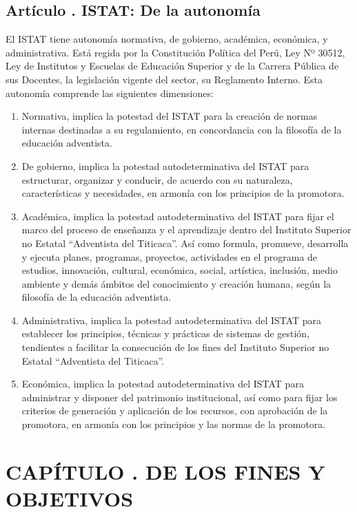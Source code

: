 \subsection{Artículo . ISTAT: De la autonomía}
\addtocounter{ns}{1}
El ISTAT tiene autonomía normativa, de gobierno, académica, económica, y administrativa. Está regida por la Constitución Política del Perú, Ley Nº 30512, Ley de Institutos y Escuelas de Educación Superior y de la Carrera Pública de sus Docentes, la legislación vigente del sector, su Reglamento Interno.  
Esta autonomía comprende las siguientes dimensiones: 
\begin{enumerate}
\item Normativa, implica la potestad del ISTAT para la creación de normas internas destinadas a su regulamiento, en concordancia con la filosofía de la educación adventista. 
\item De gobierno, implica la potestad autodeterminativa del ISTAT para estructurar, organizar y conducir, de acuerdo con su naturaleza, características y necesidades, en armonía con los principios de la promotora.  
\item Académica, implica la potestad autodeterminativa del ISTAT para fijar el marco del proceso de enseñanza y el aprendizaje dentro del Instituto Superior no Estatal “Adventista del Titicaca”. Así como formula, promueve, desarrolla y ejecuta planes, programas, proyectos, actividades en el programa de estudios, innovación, cultural, económica, social, artística, inclusión, medio ambiente y demás ámbitos del conocimiento y creación humana, según la filosofía de la educación adventista. 
\item Administrativa, implica la potestad autodeterminativa del ISTAT para establecer los principios, técnicas y prácticas de sistemas de gestión, tendientes a facilitar la consecución de los fines del Instituto Superior no Estatal “Adventista del Titicaca”.  
\item Económica, implica la potestad autodeterminativa del ISTAT para administrar y disponer del patrimonio institucional, así como para fijar los criterios de generación y aplicación de los recursos, con aprobación de la promotora, en armonía con los principios y las normas de la promotora.
\end{enumerate}

\section{CAPÍTULO . DE LOS FINES Y OBJETIVOS }
\addtocounter{re}{1}
